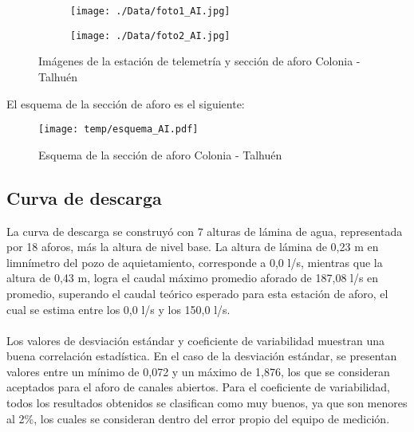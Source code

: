 \documentclass[]{article}
\begin{document}
\begin{figure}[H]
  \centering
\begin{subfigure}{.49\textwidth}
  \texttt{[image: ./Data/foto1\_AI.jpg]}
\end{subfigure}
\hfill
\begin{subfigure}{.49\textwidth}
  \texttt{[image: ./Data/foto2\_AI.jpg]}
\end{subfigure}
\caption{Imágenes de la estación de telemetría y sección de aforo Colonia - Talhuén}
\label{fig:fotos_9}
\end{figure}

El esquema de la sección de aforo es el siguiente:

\begin{figure}[H]
  \centering
  \texttt{[image: temp/esquema\_AI.pdf]}
\caption{Esquema de la sección de aforo Colonia - Talhuén}
\label{fig:Esquema_AI}
\end{figure}

\subsection{Curva de descarga}\label{curva-de-descarga-8}

La curva de descarga se construyó con 7 alturas de lámina de agua, representada por 18 aforos, más la altura de nivel base. La altura de lámina de 0,23 m en limnímetro del pozo de aquietamiento, corresponde a 0,0 l/s, mientras que la altura de 0,43 m, logra el caudal máximo promedio aforado de 187,08 l/s en promedio, superando el caudal teórico esperado para esta estación de aforo, el cual se estima entre los 0,0 l/s y los 150,0 l/s.\\
\\
Los valores de desviación estándar y coeficiente de variabilidad muestran una buena correlación estadística. En el caso de la desviación estándar, se presentan valores entre un mínimo de 0,072 y un máximo de 1,876, los que se consideran aceptados para el aforo de canales abiertos. Para el coeficiente de variabilidad, todos los resultados obtenidos se clasifican como muy buenos, ya que son menores al 2\%, los cuales se consideran dentro del error propio del equipo de medición.
\end{document}
